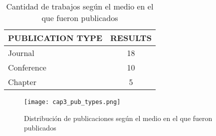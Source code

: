 \begin{table}[H]
  \begin{center}
  \begin{tabular}{| m{4cm} | c |}
    \hline
    PUBLICATION TYPE & RESULTS\\
    \hline
    \hline 
    Journal & 18 \\
    \hline
    Conference & 10 \\
    \hline
    Chapter & 5 \\
    \hline
  \end{tabular}
\end{center}
\caption{Cantidad de trabajos según el medio en el que fueron publicados}
\label{tab:ResumenForumResultados}
\end{table} 

\begin{figure}[H]
  \begin{center}
    \texttt{[image: cap3\_pub\_types.png]}
  \end{center}
  \caption{Distribución de publicaciones según el medio en el que fueron publicados}
  \label{fig:PublicacionesTipos}
\end{figure}

